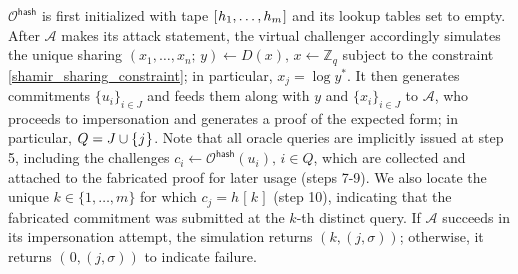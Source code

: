 \documentclass{iacrtrans}
\begin{document}
\noindent
$\mathcal{O}^{\mathsf{hash}}$
is first initialized with tape
$[\hspace{0.5pt}h_1, \dots, h_m\hspace{0.5pt}]$
and its lookup tables set to empty.
After $\mathcal{A}$ makes its attack statement,
the virtual challenger accordingly simulates the unique sharing
$(x_1, \dots, x_n;\hspace{2pt} y) \leftarrow D(x),
\hspace{2pt} x \leftarrow \mathbb{Z}_q$
subject to the constraint \eqref{shamir_sharing_constraint};
in particular, $x_j = \log y^*$.
It then generates commitments
$\{u_i\}_{i \in J}$ and feeds them
along with $y$ and $\{x_i\}_{i \in J}$
to $\mathcal{A}$, who proceeds
to impersonation
and generates a proof of the expected form;
in particular, $Q = J \cup \{\hspace{0.5pt}j\hspace{0.5pt}\}$.
Note that all oracle queries are implicitly issued
at step 5, including the challenges
$c_i \leftarrow \mathcal{O}^{\mathsf{hash}}(u_i),\hspace{2pt} i \in Q$,
which are collected and attached to the fabricated
proof for later usage (steps 7-9).
We also locate the unique $k \in \{1, \dots, m\}$
for which $c_j = h\hspace{1pt}[\hspace{1pt}k\hspace{1pt}]$
(step 10), indicating that the fabricated commitment
was submitted at the $k$-th distinct query.
If $\mathcal{A}$ succeeds in its impersonation attempt,
the simulation returns $(k, (j, \sigma))$; otherwise, it
returns $(\hspace{1pt}0, (j, \sigma))$
to indicate failure.
\end{document}
